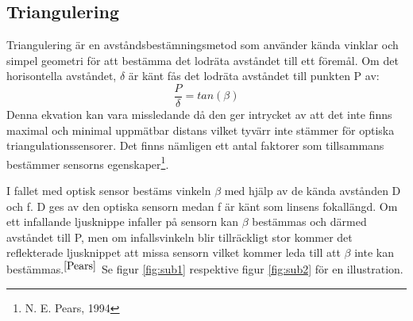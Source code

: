 \documentclass[a4paper,12pt,fleqn]{article}
\begin{document}
\subsection{Triangulering}
Triangulering är en avståndsbestämningsmetod som använder kända vinklar och simpel geometri för att bestämma det lodräta avståndet till ett föremål.
Om det horisontella avståndet, \begin{math}\delta\end{math} är känt fås det lodräta avståndet till punkten P av:
\begin{equation}
\label{eq:angle}
\frac{P}{\delta}=tan(\beta)
\end{equation}
Denna ekvation kan vara missledande då den ger intrycket av att det inte finns maximal och minimal uppmätbar distans vilket tyvärr inte stämmer för optiska triangulationssensorer.
Det finns nämligen ett antal faktorer som tillsammans bestämmer sensorns egenskaper\footnote{\label{Pears}N. E. Pears, 1994}.

I fallet med optisk sensor bestäms vinkeln \begin{math}\beta\end{math} med hjälp av de kända avstånden D och f. D ges av den optiska sensorn medan f är känt som linsens fokallängd. Om ett infallande ljusknippe infaller på sensorn kan \begin{math}\beta\end{math} bestämmas och därmed avståndet till P, men om  infallsvinkeln blir tillräckligt stor kommer det reflekterade ljusknippet att missa sensorn vilket kommer leda till att \begin{math}\beta\end{math} inte kan bestämmas.$^{\ref{Pears}}$ Se figur \ref{fig:sub1} respektive figur \ref{fig:sub2} för en illustration.
\end{document}
